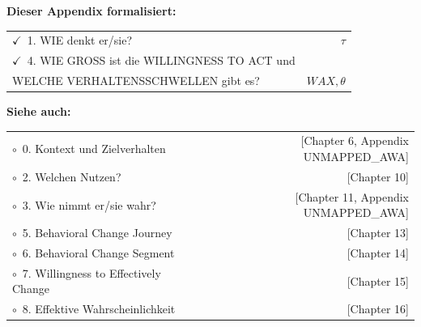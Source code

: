 \begin{tcolorbox}[
  title={\textbf{Die 9 Fragen des EBF — Appendix UNMAPPED_REA Formalisierung}},
  colback=green!3,
  colframe=green!40!black,
  fonttitle=\bfseries\sffamily,
  coltitle=white,
  boxrule=0.8pt,
  arc=2mm
]
\small\sffamily
\textbf{Dieser Appendix formalisiert:}\\[4pt]
\begin{tabular}{@{}p{}r@{}}
$\checkmark$~1. WIE denkt er/sie? & $\tau$ \\
$\checkmark$~4. WIE GROSS ist die WILLINGNESS TO ACT und & \\
\quad WELCHE VERHALTENSSCHWELLEN gibt es? & $WAX, \theta$ \\
\end{tabular}

\vspace{6pt}
\textbf{Siehe auch:}\\[4pt]
\begin{tabular}{@{}p{}r@{}}
$\circ$~0. Kontext und Zielverhalten & [Chapter 6, Appendix UNMAPPED_AWA] \\
$\circ$~2. Welchen Nutzen? & [Chapter 10] \\
$\circ$~3. Wie nimmt er/sie wahr? & [Chapter 11, Appendix UNMAPPED_AWA] \\
$\circ$~5. Behavioral Change Journey & [Chapter 13] \\
$\circ$~6. Behavioral Change Segment & [Chapter 14] \\
$\circ$~7. Willingness to Effectively Change & [Chapter 15] \\
$\circ$~8. Effektive Wahrscheinlichkeit & [Chapter 16] \\
\end{tabular}
\end{tcolorbox}


